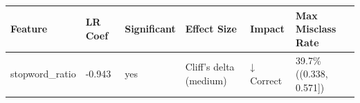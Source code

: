 \begin{tabular}{llllll}
\toprule
Feature & LR Coef & Significant & Effect Size & Impact & Max Misclass Rate \\
\midrule
stopword\_ratio & -0.943 & yes & Cliff's delta (medium) & ↓ Correct & 39.7\% ((0.338, 0.571]) \\
\bottomrule
\end{tabular}
